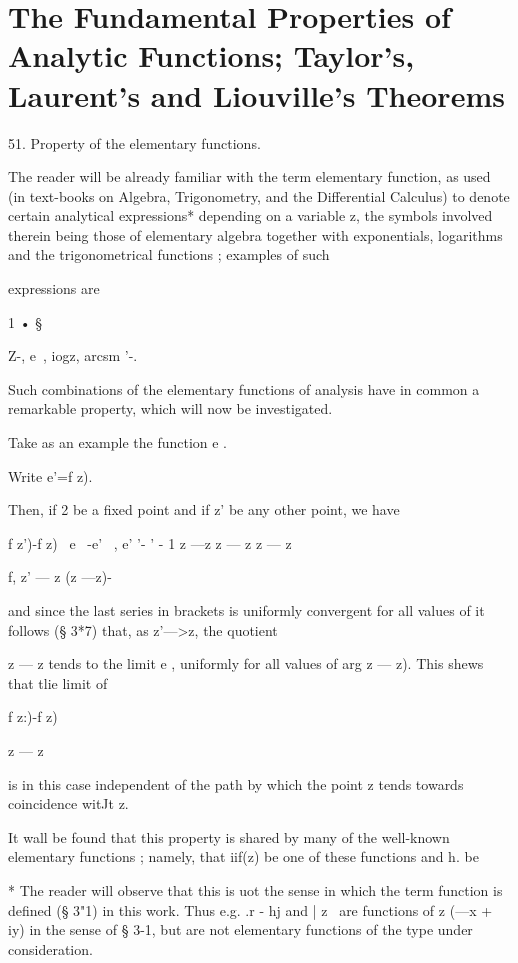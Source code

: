 \chapter{The Fundamental Properties of Analytic Functions; 
Taylor's, Laurent's and Liouville's Theorems} 

51. Property of the elementary functions.

The reader will be already familiar with the term elementary function,
as used (in text-books on Algebra, Trigonometry, and the Differential
Calculus) to denote certain analytical expressions* depending on a
variable z, the symbols involved therein being those of elementary
algebra together with exponentials, logarithms and the trigonometrical
functions ; examples of such

expressions are

1 • §

Z-, e~, iogz, arcsm '-.

Such combinations of the elementary functions of analysis have in
common a remarkable property, which will now be investigated.

Take as an example the function e .

Write e'=f z).

Then, if 2 be a fixed point and if z' be any other point, we have

f z')-f z) \ e~ -e' \ , e' '- ' - 1 z —z z — z z — z

f, z' — z (z —z)-

and since the last series in brackets is uniformly convergent for all
values of it follows (§ 3*7) that, as z'—>z, the quotient

z — z tends to the limit e , uniformly for all values of arg z — z).
This shews that tlie limit of

f z:)-f z)

z — z

is in this case independent of the path by which the point z tends
towards coincidence witJt z.

It wall be found that this property is shared by many of the
well-known elementary functions ; namely, that iif(z) be one of these
functions and h. be

* The reader will observe that this is uot the sense in which the term
function is defined (§ 3"1) in this work. Thus e.g. .r - hj and | z \
are functions of z (—x + iy) in the sense of § 3-1, but are not
elementary functions of the type under consideration.



